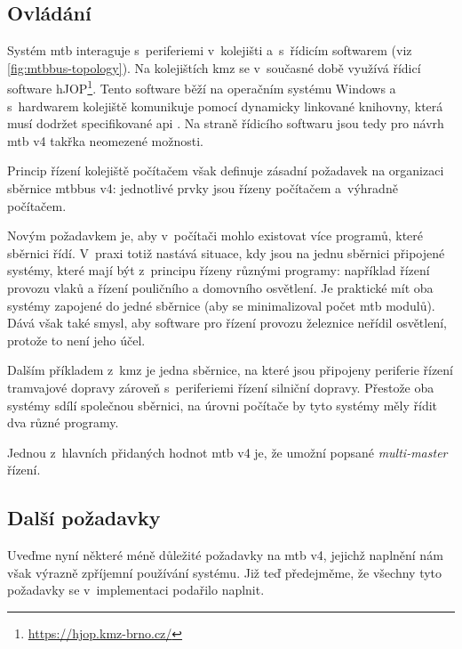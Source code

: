 \subsection{Ovládání}

Systém \gls{mtb} interaguje s~periferiemi v~kolejišti a~s~řídicím softwarem
(viz \ref{fig:mtbbus-topology}).
Na kolejištích \gls{kmz} se v~současné době využívá
řídicí software hJOP\footnote{\url{https://hjop.kmz-brno.cz/}}. Tento software
běží na operačním systému Windows a s~hardwarem kolejiště komunikuje pomocí
dynamicky linkované knihovny, která musí dodržet specifikované \gls{api}
\cite{hjop:rcs:web}.  Na straně řídicího softwaru jsou tedy pro návrh \gls{mtb}
v4 takřka neomezené možnosti.

Princip řízení kolejiště počítačem však definuje zásadní požadavek na
organizaci sběrnice \gls{mtbbus} v4: jednotlivé prvky jsou řízeny počítačem
a~výhradně počítačem.

Novým požadavkem je, aby v~počítači mohlo existovat více programů, které
sběrnici řídí. V~praxi totiž nastává situace, kdy jsou na jednu sběrnici
připojené systémy, které mají být z~principu řízeny různými programy: například
řízení provozu vlaků a řízení pouličního a domovního osvětlení.  Je praktické mít
oba systémy zapojené do jedné sběrnice (aby se minimalizoval počet \gls{mtb}
modulů). Dává však také smysl, aby software pro řízení provozu železnice neřídil
osvětlení, protože to není jeho účel.

Dalším příkladem z~\gls{kmz} je jedna sběrnice, na které jsou připojeny
periferie řízení tramvajové dopravy zároveň s~periferiemi řízení silniční
dopravy. Přestože oba systémy sdílí společnou sběrnici, na úrovni počítače by
tyto systémy měly řídit dva různé programy.

Jednou z~hlavních přidaných hodnot \gls{mtb} v4 je, že umožní popsané
\textit{multi-master} řízení.

\subsection{Další požadavky}

Uveďme nyní některé méně důležité požadavky na \gls{mtb} v4, jejichž naplnění
nám však výrazně zpříjemní používání systému. Již teď předejměme, že všechny tyto
požadavky se v~implementaci podařilo naplnit.

